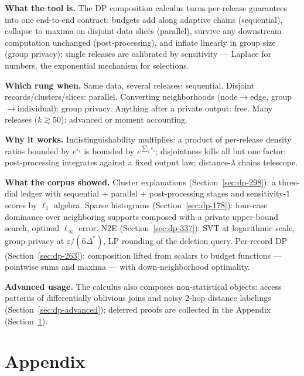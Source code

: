 \begin{recap}
\item \textbf{What the tool is.} The DP composition calculus turns per-release
  guarantees into one end-to-end contract: budgets add along adaptive chains
  (sequential), collapse to maxima on disjoint data slices (parallel), survive any
  downstream computation unchanged (post-processing), and inflate linearly in group size
  (group privacy); single releases are calibrated by sensitivity --- Laplace for
  numbers, the exponential mechanism for selections.
\item \textbf{Which rung when.} Same data, several releases: sequential. Disjoint
  records/clusters/slices: parallel. Converting neighborhoods (node$\to$edge,
  group$\to$individual): group privacy. Anything after a private output: free. Many
  releases ($k \gtrsim 50$): advanced or moment accounting.
\item \textbf{Why it works.} Indistinguishability multiplies: a product of
  per-release density ratios bounded by $e^{\varepsilon_i}$ is bounded by
  $e^{\sum_i \varepsilon_i}$; disjointness kills all but one factor; post-processing
  integrates against a fixed output law; distance-$\lambda$ chains telescope.
\item \textbf{What the corpus showed.} Cluster explanations (Section~\ref{sec:dp-298}):
  a three-dial ledger with sequential + parallel + post-processing stages and
  sensitivity-$1$ scores by $\ell_1$ algebra. Sparse histograms
  (Section~\ref{sec:dp-178}): four-case dominance over neighboring supports composed
  with a private upper-bound search, optimal $\ell_\infty$ error. N2E
  (Section~\ref{sec:dp-337}): SVT at logarithmic scale, group privacy at
  $\varepsilon/(6\Delta^*)$, LP rounding of the deletion query. Per-record DP
  (Section~\ref{sec:dp-263}): composition lifted from scalars to budget functions ---
  pointwise sums and maxima --- with down-neighborhood optimality.
\item \textbf{Advanced usage.} The calculus also composes non-statistical objects:
  access patterns of differentially oblivious joins and noisy 2-hop distance labelings
  (Section~\ref{sec:dp-advanced}); deferred proofs are collected in the Appendix
  (Section~\ref{sec:dp-appendix}).
\end{recap}

\section{Appendix}
\label{sec:dp-appendix}

